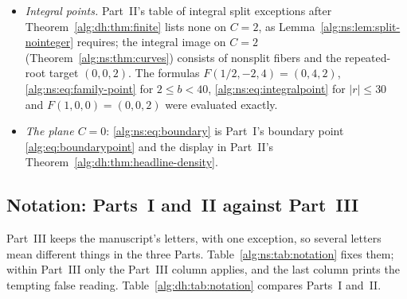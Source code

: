 \documentclass[11pt]{article}
\numberwithin{equation}{section}
\theoremstyle{plain}
\theoremstyle{plain}
\theoremstyle{plain}
\theoremstyle{definition}
\theoremstyle{definition}
\theoremstyle{definition}
\theoremstyle{remark}
\newcommand{\rpath}[1]{\nolinkurl{#1}}
\newcommand{\Hsplit}{\mathcal H^{\mathrm{sp}}}
\begin{document}
\begin{itemize}[itemsep=2pt,topsep=3pt]
every locally integral completely split target on $C=2$ is a Hasse
failure, so the manuscript's $\Sigma(T)$ is Part~II's $\#\Hsplit_2(T)$.
Its recorded values $121$, $653$, $3\,304$ at $T=10^3,10^4,10^5$ (table
in Section~\ref{alg:ns:sec:computation}) are Part~II's recorded exact
counts for $c=2$ (\rpath{data/02-dense-hasse-height_counts.txt}).
Moreover, the coefficient criterion of Theorem~\ref{alg:ns:thm:main} with
the integrality test of Corollary~\ref{alg:ns:cor:integral-test}, applied
by an independent enumeration of completely split targets on $C=c$,
reproduces all fifteen counts of Part~II's table in
Section~\ref{alg:dh:sec:count} ($c=1,2,3,4,8$ and $T=10^3,10^4,10^5$).
\item \emph{Integral points.} Part~II's table of integral split exceptions
after Theorem~\ref{alg:dh:thm:finite} lists none on $C=2$, as
Lemma~\ref{alg:ns:lem:split-nointeger} requires; the integral image on
$C=2$ (Theorem~\ref{alg:ns:thm:curves}) consists of nonsplit fibers and
the repeated-root target $(0,0,2)$. The formulas $F(1/2,-2,4)=(0,4,2)$,
\eqref{alg:ns:eq:family-point} for $2\le b<40$,
\eqref{alg:ns:eq:integralpoint} for $|r|\le30$ and $F(1,0,0)=(0,0,2)$
were evaluated exactly.
\item \emph{The plane $C=0$}: \eqref{alg:ns:eq:boundary} is Part~I's
boundary point \eqref{alg:eq:boundarypoint} and the display in Part~II's
Theorem~\ref{alg:dh:thm:headline-density}.
\end{itemize}

\subsection{Notation: Parts~I and~II against Part~III}\label{alg:ns:sec:notation}
Part~III keeps the manuscript's letters, with one exception, so several
letters mean different things in the three Parts.
Table~\ref{alg:ns:tab:notation} fixes them; within Part~III only the
Part~III column applies, and the last column prints the tempting false
reading. Table~\ref{alg:dh:tab:notation} compares Parts~I and~II.
\end{document}
